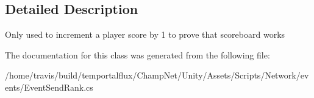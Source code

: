 \subsection{Detailed Description}
Only used to increment a player score by 1 to prove that scoreboard works 



The documentation for this class was generated from the following file\-:\begin{DoxyCompactItemize}
\item 
/home/travis/build/temportalflux/\-Champ\-Net/\-Unity/\-Assets/\-Scripts/\-Network/events/Event\-Send\-Rank.\-cs\end{DoxyCompactItemize}
